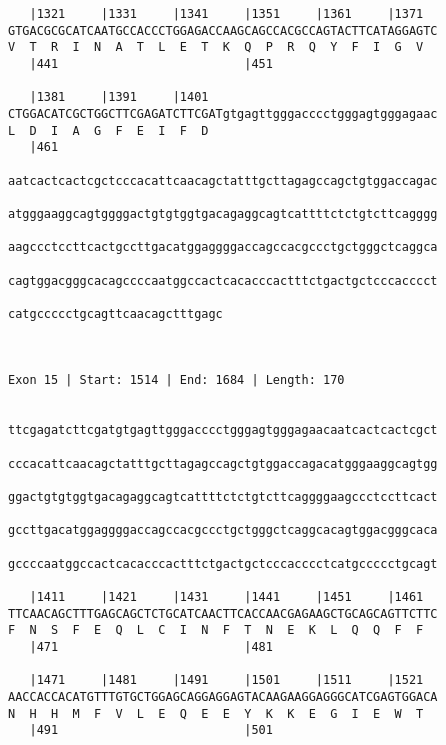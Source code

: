\documentclass{article}
\begin{document}
\begin{Verbatim}
   |1321     |1331     |1341     |1351     |1361     |1371  
GTGACGCGCATCAATGCCACCCTGGAGACCAAGCAGCCACGCCAGTACTTCATAGGAGTC
V  T  R  I  N  A  T  L  E  T  K  Q  P  R  Q  Y  F  I  G  V  
   |441                          |451                       
  
   |1381     |1391     |1401                                
CTGGACATCGCTGGCTTCGAGATCTTCGATgtgagttgggacccctgggagtgggagaac
L  D  I  A  G  F  E  I  F  D                                
   |461                                                     
  
aatcactcactcgctcccacattcaacagctatttgcttagagccagctgtggaccagac
                                                            
atgggaaggcagtggggactgtgtggtgacagaggcagtcattttctctgtcttcagggg
                                                            
aagccctccttcactgccttgacatggaggggaccagccacgccctgctgggctcaggca
                                                            
cagtggacgggcacagccccaatggccactcacacccactttctgactgctcccacccct
                                                            
catgccccctgcagttcaacagctttgagc
                              
                              
 
Exon 15 | Start: 1514 | End: 1684 | Length: 170


ttcgagatcttcgatgtgagttgggacccctgggagtgggagaacaatcactcactcgct
                                                            
cccacattcaacagctatttgcttagagccagctgtggaccagacatgggaaggcagtgg
                                                            
ggactgtgtggtgacagaggcagtcattttctctgtcttcaggggaagccctccttcact
                                                            
gccttgacatggaggggaccagccacgccctgctgggctcaggcacagtggacgggcaca
                                                            
gccccaatggccactcacacccactttctgactgctcccacccctcatgccccctgcagt
                                                            
   |1411     |1421     |1431     |1441     |1451     |1461  
TTCAACAGCTTTGAGCAGCTCTGCATCAACTTCACCAACGAGAAGCTGCAGCAGTTCTTC
F  N  S  F  E  Q  L  C  I  N  F  T  N  E  K  L  Q  Q  F  F  
   |471                          |481                       
  
   |1471     |1481     |1491     |1501     |1511     |1521  
AACCACCACATGTTTGTGCTGGAGCAGGAGGAGTACAAGAAGGAGGGCATCGAGTGGACA
N  H  H  M  F  V  L  E  Q  E  E  Y  K  K  E  G  I  E  W  T  
   |491                          |501                       
  

\end{Verbatim}
\end{document}
